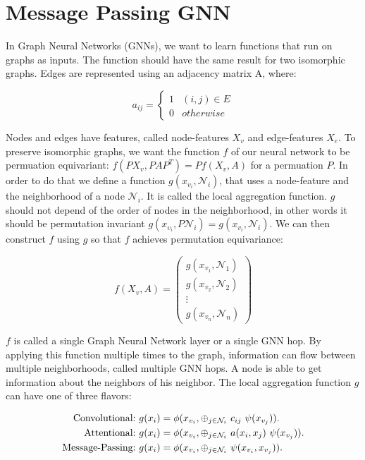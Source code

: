 \section{Message Passing GNN}
In Graph Neural Networks (GNNs), we want to learn functions that run on graphs as inputs. The function should have the same result for two isomorphic graphs. Edges are represented using an adjacency matrix A, where:

\begin{equation}
    a_{ij} = \begin{cases} 1& (i,j) \in E \\ 0 & otherwise \end{cases} \nonumber
\end{equation}

Nodes and edges have features, called node-features $X_v$ and edge-features $X_e$. To preserve isomorphic graphs, we want the function $f$ of our neural network to be permuation equivariant: $f(PX_v,PAP^T) = Pf(X_v,A)$ for a permuation $P$. In order to do that we define a function $g(x_{v_i}, \mathcal{N}_i)$, that uses a node-feature and the neighborhood of a node $\mathcal{N}_i$. It is called the local aggregation function. $g$ should not depend of the order of nodes in the neighborhood, in other words it should be permutation invariant $g(x_{v_i}, P\mathcal{N}_i) = g(x_{v_i}, \mathcal{N}_i)$. We can then construct $f$ using $g$ so that $f$ achieves permutation equivariance:

\begin{equation}
    f(X_v,A) = \begin{pmatrix} g(x_{v_1},\mathcal{N}_1) \\ g(x_{v_2},\mathcal{N}_2) \\ \vdots \\ g(x_{v_n},\mathcal{N}_n) \end{pmatrix} \nonumber
\end{equation}

$f$ is called a single Graph Neural Network layer or a single GNN hop. By applying this function multiple times to the graph, information can flow between multiple neighborhoods, called multiple GNN hops. A node is able to get information about the neighbors of his neighbor. The local aggregation function $g$ can have one of three flavors:

\begin{equation}
    \begin{aligned}
        \textup{Convolutional:}\ & g(x_i) = \phi(x_{v_i}, \oplus_{j \in \mathcal{N}_i}\ c_{ij}\ \psi(x_{v_j})).\\
        \textup{Attentional:}\ & g(x_i) = \phi(x_{v_i}, \oplus_{j \in \mathcal{N}_i}\ a(x_i,x_j)\ \psi(x_{v_j})).\\
        \textup{Message-Passing:}\ & g(x_i) = \phi(x_{v_i}, \oplus_{j \in \mathcal{N}_i}\ \psi(x_{v_i}, x_{v_j})). \\
    \end{aligned}
    \nonumber
\end{equation}

